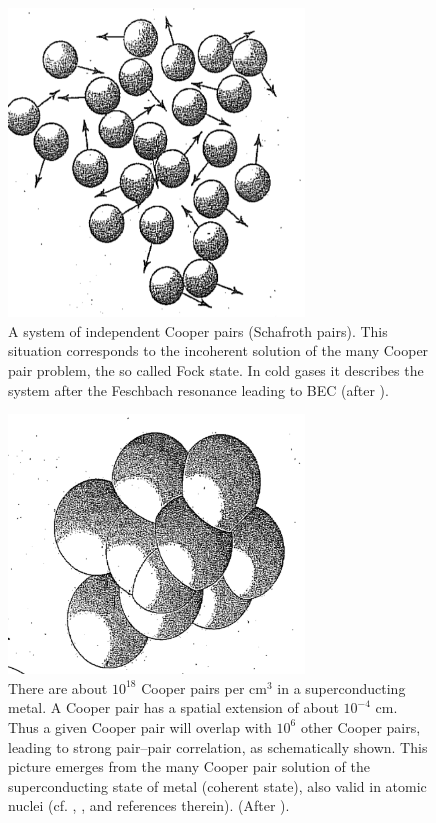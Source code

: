 \begin{figure}
\centerline{\includegraphics*[width=0.7\textwidth,angle=0]{nutshell/figs/fig1A4.pdf}}
\caption{A system of independent Cooper pairs (Schafroth pairs). This situation corresponds to the incoherent solution of the many Cooper pair problem, the so called Fock state. In cold gases it describes the system after the Feschbach resonance leading to BEC (after \cite{Rogovin:76}).}\label{fig1A4}
\end{figure}
\begin{figure}
\centerline{\includegraphics*[width=0.7\textwidth,angle=0]{nutshell/figs/fig1A5.pdf}}
\caption{There are about $10^{18}$ Cooper pairs per cm$^{3}$ in a superconducting metal. A Cooper pair has a spatial extension of about $10^{-4}$ cm. Thus a given Cooper pair will overlap with  $10^{6}$ other Cooper pairs, leading to strong pair--pair correlation, as schematically shown. This picture emerges from  the many Cooper pair solution of the superconducting state of metal  (coherent state), also valid in atomic nuclei (cf. \cite{Schrieffer:64}, \cite{Brink:05}, and references therein). (After \cite{Rogovin:76}).}\label{fig1A5}
\end{figure}
